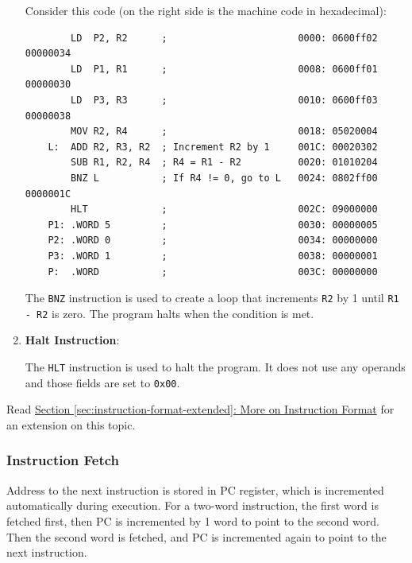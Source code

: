 \begin{enumerate}
\begin{example}
    Consider this code (on the right side is the machine code in hexadecimal):
    \begin{verbatim}
        LD  P2, R2      ;                       0000: 0600ff02 00000034
        LD  P1, R1      ;                       0008: 0600ff01 00000030
        LD  P3, R3      ;                       0010: 0600ff03 00000038
        MOV R2, R4      ;                       0018: 05020004
    L:  ADD R2, R3, R2  ; Increment R2 by 1     001C: 00020302
        SUB R1, R2, R4  ; R4 = R1 - R2          0020: 01010204
        BNZ L           ; If R4 != 0, go to L   0024: 0802ff00 0000001C
        HLT             ;                       002C: 09000000 
    P1: .WORD 5         ;                       0030: 00000005
    P2: .WORD 0         ;                       0034: 00000000
    P3: .WORD 1         ;                       0038: 00000001
    P:  .WORD           ;                       003C: 00000000
    \end{verbatim}
    The \texttt{BNZ} instruction is used to create a loop that increments \texttt{R2} by 1
    until \texttt{R1 - R2} is zero. The program halts when the condition is met.
\end{example}

\item \textbf{Halt Instruction}:

The \texttt{HLT} instruction is used to halt the program. It does not use any operands
and those fields are set to \texttt{0x00}.

\end{enumerate}


\begin{remark}
    Read \hyperref[sec:instruction-format-extended]{Section \ref*{sec:instruction-format-extended}: More on Instruction Format}
    for an extension on this topic.
\end{remark}

\subsubsection{Instruction Fetch}

Address to the next instruction is stored in PC register, which is incremented automatically
during execution. For a two-word instruction, the first word is fetched first, then PC
is incremented by 1 word to point to the second word. Then the second word is fetched,
and PC is incremented again to point to the next instruction.


